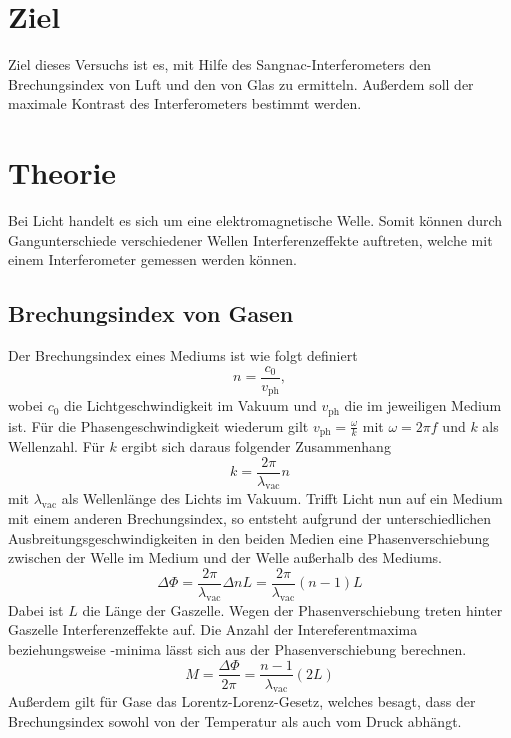 \section{Ziel}
\label{sec:Ziel}
Ziel dieses Versuchs ist es, mit Hilfe des Sangnac-Interferometers den Brechungsindex von Luft und den von Glas zu ermitteln. Außerdem soll der maximale Kontrast des Interferometers bestimmt werden.

\section{Theorie}
\label{sec:theorie}
Bei Licht handelt es sich um eine elektromagnetische Welle. Somit können durch Gangunterschiede verschiedener Wellen Interferenzeffekte auftreten, welche mit einem Interferometer gemessen werden können.

\subsection{Brechungsindex von Gasen}
Der Brechungsindex eines Mediums ist wie folgt definiert
\begin{equation}
  n=\frac{c_0}{v_\mathrm{ph}},
\end{equation}
wobei $c_0$ die Lichtgeschwindigkeit im Vakuum und $v_\mathrm{ph}$ die im jeweiligen Medium ist. Für die Phasengeschwindigkeit wiederum gilt $v_\mathrm{ph}=\frac{\omega}{k}$ mit $\omega = 2\pi f$ und $k$ als Wellenzahl. Für $k$ ergibt sich daraus folgender Zusammenhang
\begin{equation}
  k=\frac{2\pi}{\lambda_\mathrm{vac}}n
\end{equation}
mit $\lambda_\mathrm{vac}$ als Wellenlänge des Lichts im Vakuum. Trifft Licht nun auf ein Medium mit einem anderen Brechungsindex, so entsteht aufgrund der unterschiedlichen Ausbreitungsgeschwindigkeiten in den beiden Medien eine Phasenverschiebung zwischen der Welle im Medium und der Welle außerhalb des Mediums.
\begin{equation}
  \Delta \Phi = \frac{2\pi}{\lambda_\mathrm{vac}}\Delta n L = \frac{2\pi}{\lambda_\mathrm{vac}}(n-1)L
\end{equation}
Dabei ist $L$ die Länge der Gaszelle. Wegen der Phasenverschiebung treten hinter Gaszelle Interferenzeffekte auf. Die Anzahl der Intereferentmaxima beziehungsweise -minima lässt sich aus der Phasenverschiebung berechnen.
\begin{equation}
  \label{eqn:gas}
  M=\frac{\Delta \Phi}{2\pi} = \frac{n-1}{\lambda_\mathrm{vac}}(2L)
\end{equation}
Außerdem gilt für Gase das Lorentz-Lorenz-Gesetz, welches besagt, dass der Brechungsindex sowohl von der Temperatur als auch vom Druck abhängt.

